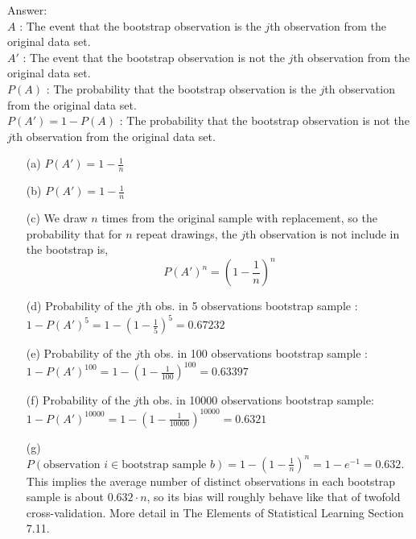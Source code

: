 \documentclass[12pt,a4paper]{article}%
\theoremstyle{definition}
\theoremstyle{plain}
\numberwithin{equation}{section}
\begin{document}
\begin{oframed}
Answer: ~\\
$A$ : The event that the bootstrap observation is the $j$th observation from the original data set. \\
$A'$ : The event that the bootstrap observation is not the $j$th observation from the original data set. \\
$P(A)$ : The probability that the bootstrap observation is the $j$th observation from the original data set. \\
$P(A')= 1-P(A)$ : The probability that the bootstrap observation is not the $j$th observation from the original data set.
\begin{enumerate}
	\item[(a)] $P(A') = 1-\frac{1}{n}$
	\item[(b)] $P(A') = 1-\frac{1}{n}$
	\item[(c)] We draw $n$ times from the original sample with replacement, so the probability that for $n$ repeat drawings, the $j$th observation is not include in the bootstrap is,
		\begin{equation*}
			P(A')^{n} = (1-\frac{1}{n})^{n}
		\end{equation*}
	\item[(d)] Probability of the $j$th obs. in 5 observations bootstrap sample : \\ $ 1-P(A')^{5} = 1-(1-\frac{1}{5})^{5} = 0.67232$
	\item[(e)] Probability of the $j$th obs. in 100 observations bootstrap sample : \\ $ 1-P(A')^{100} = 1-(1-\frac{1}{100})^{100} = 0.63397 $	
	\item[(f)] Probability of the $j$th obs. in 10000 observations bootstrap sample: \\ $ 1-P(A')^{10000} = 1-(1-\frac{1}{10000})^{10000} = 0.6321  $	
	\item[(g)] $P(\text{observation }i \in \text{bootstrap sample } b) = 1-(1-\frac{1}{n})^{n} = 1-e^{-1}=0.632$. \\
			   This implies the average number of distinct observations in each bootstrap sample is about $0.632 \cdot n$, so its bias will roughly behave like that of twofold cross-validation.
			   More detail in The Elements of Statistical Learning Section 7.11.
\end{enumerate}
\end{oframed}
\end{document}
